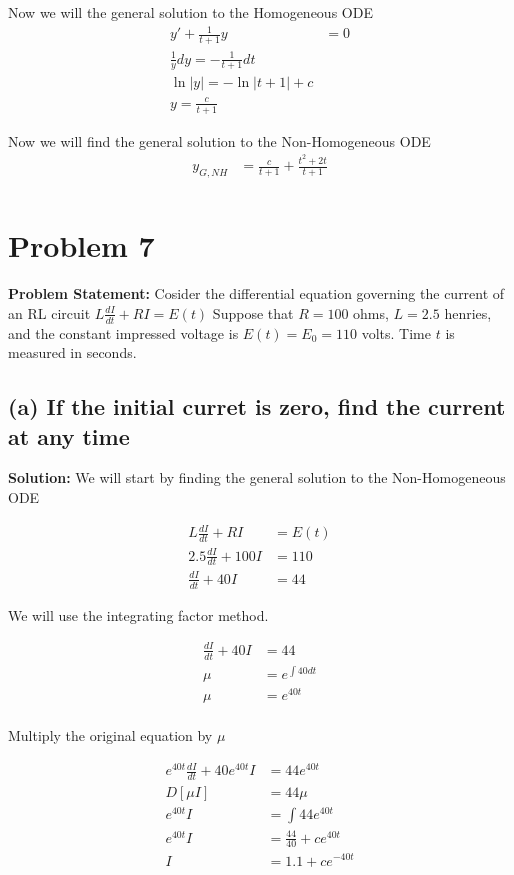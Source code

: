 \documentclass[12pt, letterpaper]{article}
\begin{document}
Now we will the general solution to the Homogeneous ODE
\begin{align*}
y' + \frac{1}{t+1}y &= 0 \\
\frac{1}{y}dy = -\frac{1}{t+1}dt \\
\ln|y| = -\ln|t+1| + c \\
y = \frac{c}{t+1}
\end{align*}

Now we will find the general solution to the Non-Homogeneous ODE
\begin{align*}
y_{G,NH} &= \frac{c}{t+1} + \frac{t^2 + 2t}{t+1} \\
\end{align*}

\section*{Problem 7}
\textbf{Problem Statement:} Cosider the differential equation governing the current of an RL circuit $L\frac{dI}{dt} + RI = E(t)$ Suppose that $R = 100$ ohms, $L = 2.5$ henries, and the constant impressed voltage is $E(t) = E_0 = 110$ volts. Time $t$ is measured in seconds.

\subsection*{(a) If the initial curret is zero, find the current at any time}

\textbf{Solution:} We will start by finding the general solution to the Non-Homogeneous ODE

\begin{align*}
L\frac{dI}{dt} + RI &= E(t) \\
2.5\frac{dI}{dt} + 100I &= 110 \\
\frac{dI}{dt} + 40I &= 44
\end{align*}

We will use the integrating factor method.

\begin{align*}
\frac{dI}{dt} + 40I &= 44 \\
\mu &= e^{\int 40dt} \\
\mu &= e^{40t} \\
\end{align*}

Multiply the original equation by $\mu$

\begin{align*}
e^{40t}\frac{dI}{dt} + 40e^{40t}I &= 44e^{40t} \\
D[\mu I] &= 44 \mu \\
e^{40t}I &= \int 44e^{40t} \\
e^{40t}I &= \frac{44}{40} + ce^{40t} \\
I &= 1.1 + ce^{-40t}
\end{align*}
\end{document}
